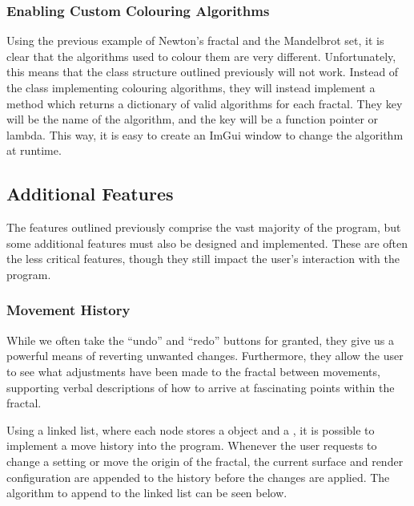 \subsubsection{Enabling Custom Colouring Algorithms}

Using the previous example of Newton's fractal and the Mandelbrot set, it is clear that the algorithms used to colour them are very different. Unfortunately, this means that the class structure outlined previously will not work. Instead of the  class implementing colouring algorithms, they will instead implement a method which returns a dictionary of valid algorithms for each fractal. They key will be the name of the algorithm, and the key will be a function pointer or lambda. This way, it is easy to create an ImGui window to change the algorithm at runtime.



\subsection{Additional Features}

The features outlined previously comprise the vast majority of the program, but some additional features must also be designed and implemented. These are often the less critical features, though they still impact the user's interaction with the program.  

\subsubsection{Movement History}

While we often take the ``undo'' and ``redo'' buttons for granted, they give us a powerful means of reverting unwanted changes. Furthermore, they allow the user to see what adjustments have been made to the fractal between movements, supporting verbal descriptions of how to arrive at fascinating points within the fractal.

Using a linked list, where each node stores a  object and a , it is possible to implement a move history into the program. Whenever the user requests to change a setting or move the origin of the fractal, the current surface and render configuration are appended to the history before the changes are applied. The algorithm to append to the linked list can be seen below.

